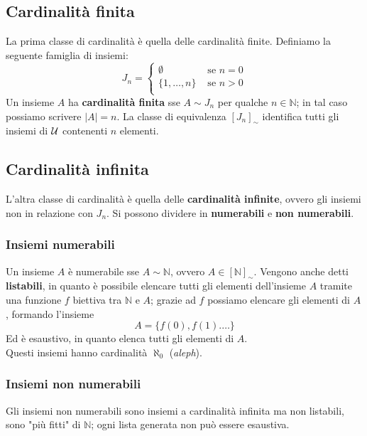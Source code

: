 \subsection{Cardinalità finita}
La prima classe di cardinalità è quella delle cardinalità finite. Definiamo la seguente famiglia di insiemi:
$$ J_n = \begin{cases}
	\emptyset & \text{ se } n = 0 \\
	\{1, \dots , n\} & \text{ se } n > 0 \\
\end{cases}$$
Un insieme $A$ ha \textbf{cardinalità finita} sse $A \sim J_n$ per qualche $n \in \mathbb{N}$; in tal caso possiamo scrivere $|A| = n$. La classe di equivalenza $[J_n]_{\sim}$ identifica tutti gli insiemi di $\mathcal{U}$ contenenti $n$ elementi.\\

\subsection{Cardinalità infinita}
L'altra classe di cardinalità è quella delle \textbf{cardinalità infinite}, ovvero gli insiemi non in relazione con $J_n$. Si possono dividere in \textbf{numerabili} e \textbf{non numerabili}.

\subsubsection{Insiemi numerabili}
Un insieme $A$ è numerabile sse $A \sim \mathbb{N}$, ovvero $A \in [\mathbb{N}]_\sim$. Vengono anche detti \textbf{listabili}, in quanto è possibile elencare tutti gli elementi dell'insieme $A$ tramite una funzione $f$ biettiva tra $\mathbb{N}$ e $A$; grazie ad $f$ possiamo elencare gli elementi di $A$, formando l'insieme 
$$ A = \{f(0), f(1). \dots \} $$
Ed è esaustivo, in quanto elenca tutti gli elementi di $A$.\\

Questi insiemi hanno cardinalità $\aleph_0$ (\textit{aleph}).\\

\subsubsection{Insiemi non numerabili}
Gli insiemi non numerabili sono insiemi a cardinalità infinita ma non listabili, sono "più fitti" di $\mathbb{N}$; ogni lista generata non può essere esaustiva.\\

